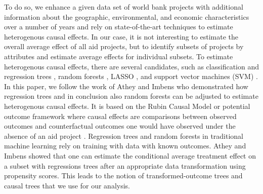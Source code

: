 To do so, we enhance a given data set of world bank projects with additional information about the geographic, environmental, and economic 
characteristics over a number of years and rely on state-of-the-art techniques to estimate heterogenous causal effects. 
In our case, it is not interesting to estimate the overall average effect of all aid projects, but to identify subsets of projects by attributes and estimate average effects for individual subsets.
To estimate heterogenous causal effects, there are several candidates, such as classification and regression trees  \cite{Breiman:2001:RF:570181.570182}, random forests \cite{breiman1984classification}, LASSO \cite{Tibshirani94regressionshrinkage}, and support vector machines (SVM) \cite{Vapnik1998}. 
In this paper, we follow the work of Athey and Imbens \cite{1504.01132} who demonstrated how regression trees and in conclusion also random forests can be adjusted to estimate heterogenous causal effects. It is based on the Rubin Causal Model or potential outcome framework where causal effects are comparisons between observed outcomes and counterfactual outcomes one would have observed under the absence of an aid project \cite{Imbens:2015:CIS:2764565}. Regression trees and random forests in traditional machine learning rely on training with data with known outcomes. Athey and Imbens showed that one can estimate the conditional average treatment effect on a  subset with regressions trees after an appropriate data transformation using propensity scores. This leads to the notion of transformed-outcome trees and causal trees that we use for our analysis. 

